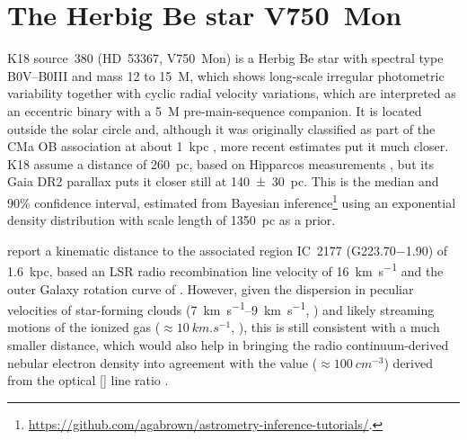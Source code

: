 \documentclass[useAMS, usenatbib, a4paper]{mnras}
\newcommand\hii{\ion{H}{ii}}
\begin{document}
\section{The Herbig Be star V750~Mon}
\label{sec:notes-part-sourc}
\label{sec:hd-53367-v750}

K18 source~380 (HD~53367, V750~Mon) is a Herbig Be star with spectral
type B0V--B0III and mass 12 to \SI{15}{M_\odot}, which shows
long-scale irregular photometric variability \citep{Tjin-A-Djie:2001a,
  Pogodin:2006a} together with cyclic radial velocity variations,
which are interpreted as an eccentric binary with a \SI{5}{M_\odot}
pre-main-sequence companion.  It is located outside the solar circle
and, although it was originally classified as part of the CMa OB
association at about \SI{1}{kpc} \citep{Tjin-A-Djie:2001a}, more
recent estimates put it much closer.  K18 assume a distance of
\SI{260}{pc}, based on Hipparcos measurements
\citep{van-Leeuwen:2007a}, but its Gaia DR2 parallax
\citep{Gaia-Collaboration:2016a, Gaia-Collaboration:2018a, Luri:2018a}
puts it closer still at \SI{140 \pm 30}{pc}.  This is the median and
90\% confidence interval, estimated from Bayesian
inference\footnote{\url{https://github.com/agabrown/astrometry-inference-tutorials/}.}
using an exponential density distribution with scale length of
\SI{1350}{pc} as a prior.

\citet{Quireza:2006b} report a kinematic distance to the associated
\hii{} region IC~2177 (G\num{223.70}\num{-1.90}) of \SI{1.6}{kpc},
based an LSR radio recombination line velocity of \SI{+16}{km.s^{-1}}
\citep{Quireza:2006a} and the outer Galaxy rotation curve of
\citet{Brand:1993a}.  However, given the dispersion in peculiar
velocities of star-forming clouds (\SIrange{7}{9}{km.s^{-1}},
\citealp{Stark:1984a}) and likely streaming motions of the ionized gas
(\(\approx \SI{10}{km.s^{-1}}\), \citealp{Matzner:2002a, Lee:2012a}),
this is still consistent with a much smaller distance, which would
also help in bringing the radio continuum-derived nebular electron
density into agreement with the value (\(\approx \SI{100}{cm^{-3}}\))
derived from the optical [] line ratio
\citep{Hawley:1978a}.
\end{document}
